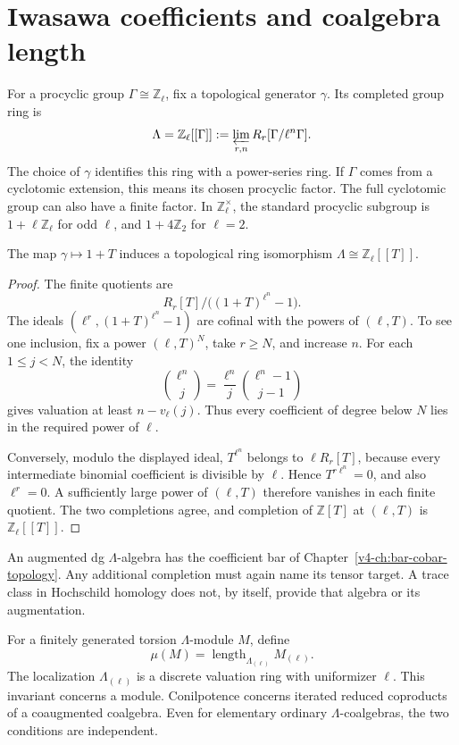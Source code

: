 \section{Iwasawa coefficients and coalgebra length}
\label{v4-arith:coefficients:sec:iwasawa}

For a procyclic group \(\Gamma\cong\mathbb Z_\ell\), fix a
topological generator \(\gamma\). Its completed group ring is
\[
 \Lambda=\mathbb Z_\ell[[\Gamma]]
 :=\varprojlim_{r,n}R_r[\Gamma/\ell^n\Gamma].
\]
The choice of \(\gamma\) identifies this ring with a power-series
ring. If \(\Gamma\) comes from a cyclotomic extension, this means
its chosen procyclic factor. The full cyclotomic group can also have
a finite factor. In \(\mathbb Z_\ell^\times\), the standard
procyclic subgroup is \(1+\ell\mathbb Z_\ell\) for odd \(\ell\),
and \(1+4\mathbb Z_2\) for \(\ell=2\).

\begin{proposition}\label{v4-arith:coefficients:prop:iwasawa}
The map \(\gamma\mapsto1+T\) induces a topological ring
isomorphism \(\Lambda\cong\mathbb Z_\ell[[T]]\).
\end{proposition}
\begin{proof}
The finite quotients are
\[
 R_r[T]\big/\bigl((1+T)^{\ell^n}-1\bigr).
\]
The ideals \((\ell^r,(1+T)^{\ell^n}-1)\) are cofinal with
the powers of \((\ell,T)\). To see one inclusion, fix a power
\((\ell,T)^N\), take \(r\geq N\), and increase \(n\).
For each \(1\leq j<N\), the identity
\[
 \binom{\ell^n}{j}=\frac{\ell^n}{j}
                         \binom{\ell^n-1}{j-1}
\]
gives valuation at least \(n-v_\ell(j)\). Thus every coefficient
of degree below \(N\) lies in the required power of \(\ell\).

Conversely, modulo the displayed ideal,
\(T^{\ell^n}\) belongs to \(\ell R_r[T]\), because every
intermediate binomial coefficient is divisible by \(\ell\).
Hence \(T^{r\ell^n}=0\), and also \(\ell^r=0\).
A sufficiently large power of \((\ell,T)\) therefore vanishes in
each finite quotient. The two completions agree, and completion of
\(\mathbb Z[T]\) at \((\ell,T)\) is \(\mathbb Z_\ell[[T]]\).
\end{proof}

An augmented dg \(\Lambda\)-algebra has the coefficient bar of
Chapter~\ref{v4-ch:bar-cobar-topology}. Any additional completion must
again name its tensor target. A trace class in Hochschild homology
does not, by itself, provide that algebra or its augmentation.

For a finitely generated torsion \(\Lambda\)-module \(M\), define
\[
 \mu(M)=\operatorname{length}_{\Lambda_{(\ell)}}M_{(\ell)}.
\]
The localization \(\Lambda_{(\ell)}\) is a discrete valuation ring
with uniformizer \(\ell\). This invariant concerns a module.
Conilpotence concerns iterated reduced coproducts of a coaugmented
coalgebra. Even for elementary ordinary \(\Lambda\)-coalgebras,
the two conditions are independent.

